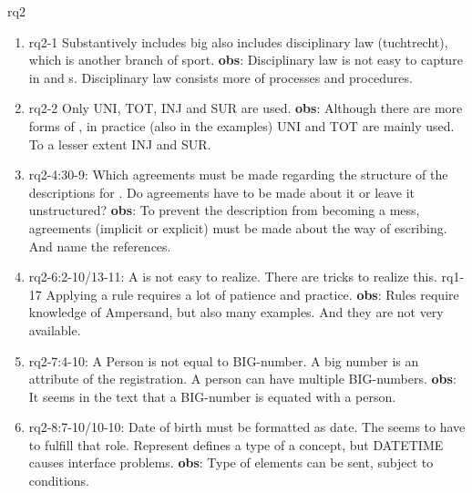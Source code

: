 \def\rq{rq2}

\acrlong{\rq}

\begin{enumerate}
    \item rq2-1 Substantively includes \acrshort{big} also includes disciplinary law (tuchtrecht), which is another branch of sport.
    \newline\textbf{obs}: Disciplinary law is not easy to capture in  and s.
    Disciplinary law consists more of processes and procedures.
     
    \item rq2-2 Only UNI, TOT, INJ and SUR are used.
    \newline\textbf{obs}: Although there are more forms of , in practice (also in the examples) UNI and TOT are mainly used.
    To a lesser extent INJ and SUR.
     
     
    \item rq2-4:30-9: Which agreements must be made regarding the structure of the descriptions for .
    Do agreements have to be made about it or leave it unstructured?    
    \newline\textbf{obs}: To prevent the description from becoming a mess, agreements (implicit or explicit) must be made about the way of escribing.
    And name the references.
    
    \item rq2-6:2-10/13-11: A  is not easy to realize.
    There are tricks to realize this.
    \newline rq1-17 Applying a rule requires a lot of patience and practice.
    \newline\textbf{obs}: Rules require knowledge of Ampersand, but also many examples.
    And they are not very available.
    
    \item rq2-7:4-10: A  Person is not equal to BIG-number.
    A big number is an attribute of the registration.
    A person can have multiple BIG-numbers.
    \newline\textbf{obs}: It seems in the text that a BIG-number is equated with a person.
    
    \item rq2-8:7-10/10-10: Date of birth must be formatted as date.
    The  seems to have to fulfill that role.
    Represent defines a type of a concept, but DATETIME causes interface problems.
    \newline\textbf{obs}: Type of elements can be sent, subject to conditions.
    

\end{enumerate}
